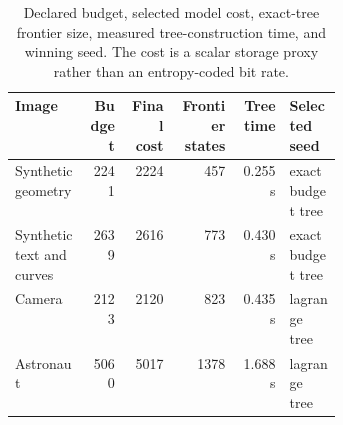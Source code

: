 \begin{table}[tbp]
\centering
\small
\begin{tabular}{L{0.22\linewidth}rrrrL{0.16\linewidth}}
\toprule
Image & Budget & Final cost & Frontier states & Tree time & Selected seed\\
\midrule
Synthetic geometry & 2241 & 2224 & 457 & 0.255 s & exact budget tree\\
Synthetic text and curves & 2639 & 2616 & 773 & 0.430 s & exact budget tree\\
Camera & 2123 & 2120 & 823 & 0.435 s & lagrange tree\\
Astronaut & 5060 & 5017 & 1378 & 1.688 s & lagrange tree\\
\bottomrule
\end{tabular}
\caption{Declared budget, selected model cost, exact-tree frontier size, measured tree-construction time, and winning seed. The cost is a scalar storage proxy rather than an entropy-coded bit rate.}
\label{tab:final-budget-selection}
\end{table}
